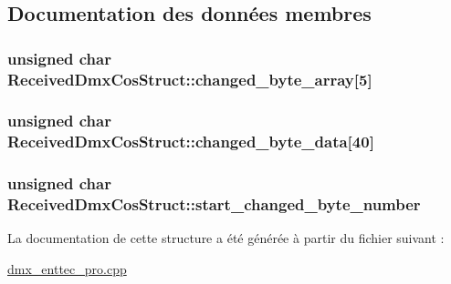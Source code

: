 \subsection{Documentation des données membres}
\hypertarget{struct_received_dmx_cos_struct_a863941290eeb0f634dd83aa8a2389718}{
\subsubsection[{changed\+\_\+byte\+\_\+array}]{\setlength{\rightskip}{0pt plus 5cm}unsigned char Received\+Dmx\+Cos\+Struct\+::changed\+\_\+byte\+\_\+array\mbox{[}5\mbox{]}}}\label{struct_received_dmx_cos_struct_a863941290eeb0f634dd83aa8a2389718}
\hypertarget{struct_received_dmx_cos_struct_aa3984590d4af300c37c465375dd7ba0f}{
\subsubsection[{changed\+\_\+byte\+\_\+data}]{\setlength{\rightskip}{0pt plus 5cm}unsigned char Received\+Dmx\+Cos\+Struct\+::changed\+\_\+byte\+\_\+data\mbox{[}40\mbox{]}}}\label{struct_received_dmx_cos_struct_aa3984590d4af300c37c465375dd7ba0f}
\hypertarget{struct_received_dmx_cos_struct_a4cf39b60236997522f11155b63b2f090}{
\subsubsection[{start\+\_\+changed\+\_\+byte\+\_\+number}]{\setlength{\rightskip}{0pt plus 5cm}unsigned char Received\+Dmx\+Cos\+Struct\+::start\+\_\+changed\+\_\+byte\+\_\+number}}\label{struct_received_dmx_cos_struct_a4cf39b60236997522f11155b63b2f090}


La documentation de cette structure a été générée à partir du fichier suivant \+:\begin{DoxyCompactItemize}
\item 
\hyperlink{dmx__enttec__pro_8cpp}{dmx\+\_\+enttec\+\_\+pro.\+cpp}\end{DoxyCompactItemize}
